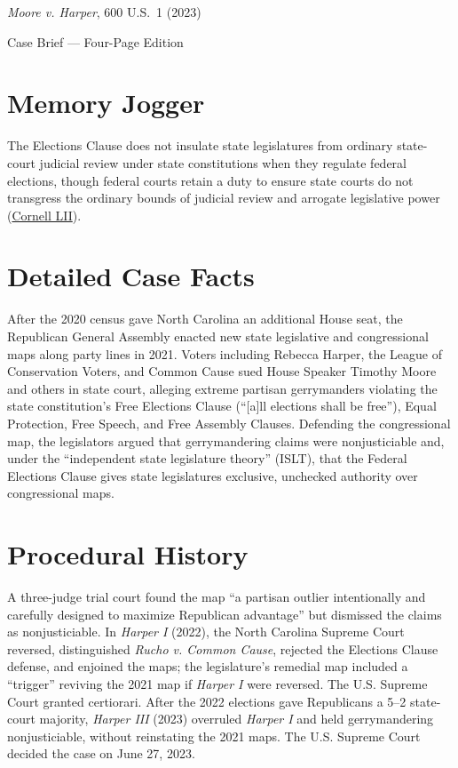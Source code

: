 \documentclass[12pt]{article}
\begin{document}
\begin{center}
{\LARGE \textit{Moore v. Harper}, 600 U.S.\ 1 (2023)\par}
\vspace{0.8em}
{\large Case Brief --- Four-Page Edition\par}
\end{center}
\vspace{1em}

\section{Memory Jogger}

The Elections Clause does not insulate state legislatures from ordinary state-court judicial review under state constitutions when they regulate federal elections, though federal courts retain a duty to ensure state courts do not transgress the ordinary bounds of judicial review and arrogate legislative power (\href{https://www.law.cornell.edu/supremecourt/text/21-1271}{Cornell LII}).

\section{Detailed Case Facts}

After the 2020 census gave North Carolina an additional House seat, the Republican General Assembly enacted new state legislative and congressional maps along party lines in 2021. Voters including Rebecca Harper, the League of Conservation Voters, and Common Cause sued House Speaker Timothy Moore and others in state court, alleging extreme partisan gerrymanders violating the state constitution's Free Elections Clause (``[a]ll elections shall be free''), Equal Protection, Free Speech, and Free Assembly Clauses. Defending the congressional map, the legislators argued that gerrymandering claims were nonjusticiable and, under the ``independent state legislature theory'' (ISLT), that the Federal Elections Clause gives state legislatures exclusive, unchecked authority over congressional maps.

\section{Procedural History}

A three-judge trial court found the map ``a partisan outlier intentionally and carefully designed to maximize Republican advantage'' but dismissed the claims as nonjusticiable. In \textit{Harper I} (2022), the North Carolina Supreme Court reversed, distinguished \textit{Rucho v. Common Cause}, rejected the Elections Clause defense, and enjoined the maps; the legislature's remedial map included a ``trigger'' reviving the 2021 map if \textit{Harper I} were reversed. The U.S. Supreme Court granted certiorari. After the 2022 elections gave Republicans a 5--2 state-court majority, \textit{Harper III} (2023) overruled \textit{Harper I} and held gerrymandering nonjusticiable, without reinstating the 2021 maps. The U.S. Supreme Court decided the case on June 27, 2023.
\end{document}
